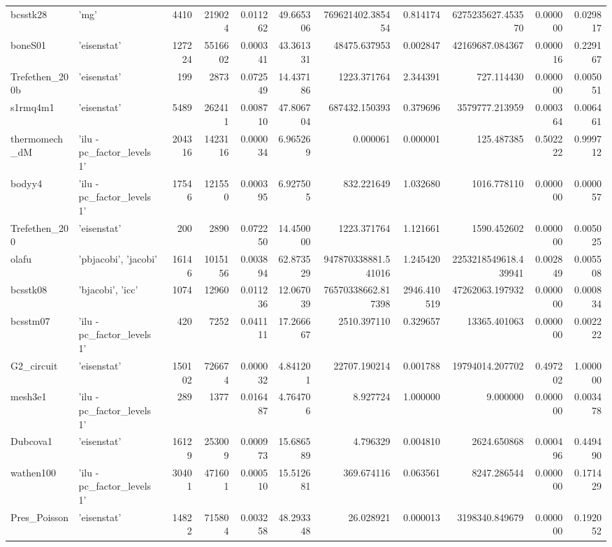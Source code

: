 \begin{tabular}{llrrrrrrrrr}
bcsstk28 & {'mg'} & 4410 & 219024 & 0.011262 & 49.665306 & 769621402.385454 & 0.814174 & 6275235627.453570 & 0.000000 & 0.029817 \\
boneS01 & {'eisenstat'} & 127224 & 5516602 & 0.000341 & 43.361331 & 48475.637953 & 0.002847 & 42169687.084367 & 0.000016 & 0.229167 \\
Trefethen\_200b & {'eisenstat'} & 199 & 2873 & 0.072549 & 14.437186 & 1223.371764 & 2.344391 & 727.114430 & 0.000000 & 0.005051 \\
s1rmq4m1 & {'eisenstat'} & 5489 & 262411 & 0.008710 & 47.806704 & 687432.150393 & 0.379696 & 3579777.213959 & 0.000364 & 0.006461 \\
thermomech\_dM & {'ilu -pc\_factor\_levels 1'} & 204316 & 1423116 & 0.000034 & 6.965269 & 0.000061 & 0.000001 & 125.487385 & 0.502222 & 0.999712 \\
bodyy4 & {'ilu -pc\_factor\_levels 1'} & 17546 & 121550 & 0.000395 & 6.927505 & 832.221649 & 1.032680 & 1016.778110 & 0.000000 & 0.000057 \\
Trefethen\_200 & {'eisenstat'} & 200 & 2890 & 0.072250 & 14.450000 & 1223.371764 & 1.121661 & 1590.452602 & 0.000000 & 0.005025 \\
olafu & {'pbjacobi', 'jacobi'} & 16146 & 1015156 & 0.003894 & 62.873529 & 947870338881.541016 & 1.245420 & 2253218549618.439941 & 0.002849 & 0.005508 \\
bcsstk08 & {'bjacobi', 'icc'} & 1074 & 12960 & 0.011236 & 12.067039 & 76570338662.817398 & 2946.410519 & 47262063.197932 & 0.000000 & 0.000834 \\
bcsstm07 & {'ilu -pc\_factor\_levels 1'} & 420 & 7252 & 0.041111 & 17.266667 & 2510.397110 & 0.329657 & 13365.401063 & 0.000000 & 0.002222 \\
G2\_circuit & {'eisenstat'} & 150102 & 726674 & 0.000032 & 4.841201 & 22707.190214 & 0.001788 & 19794014.207702 & 0.497202 & 1.000000 \\
mesh3e1 & {'ilu -pc\_factor\_levels 1'} & 289 & 1377 & 0.016487 & 4.764706 & 8.927724 & 1.000000 & 9.000000 & 0.000000 & 0.003478 \\
Dubcova1 & {'eisenstat'} & 16129 & 253009 & 0.000973 & 15.686589 & 4.796329 & 0.004810 & 2624.650868 & 0.000496 & 0.449490 \\
wathen100 & {'ilu -pc\_factor\_levels 1'} & 30401 & 471601 & 0.000510 & 15.512681 & 369.674116 & 0.063561 & 8247.286544 & 0.000000 & 0.171429 \\
Pres\_Poisson & {'eisenstat'} & 14822 & 715804 & 0.003258 & 48.293348 & 26.028921 & 0.000013 & 3198340.849679 & 0.000000 & 0.192052 \\

\end{tabular}
